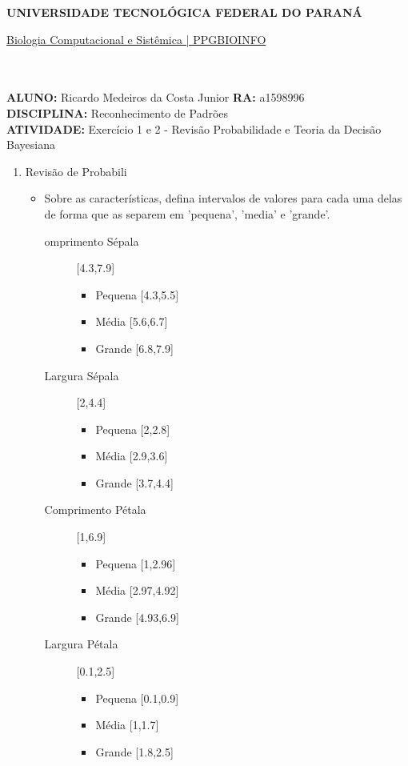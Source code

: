 \documentclass[a4paper, 12pt]{article}
\begin{document}
\textbf{UNIVERSIDADE TECNOLÓGICA FEDERAL DO PARANÁ}\\
\centerline{\underline{Biologia Computacional e Sistêmica | PPGBIOINFO}}\\\\
\textbf{ALUNO:} Ricardo Medeiros da Costa Junior   \textbf{RA:} a1598996 \\
\textbf{DISCIPLINA:} Reconhecimento de Padrões\\
\textbf{ATIVIDADE:} Exercício 1 e 2 - Revisão Probabilidade e Teoria da Decisão Bayesiana \\
\begin{enumerate}
  \item Revisão de Probabili
\begin{itemize} 
\item Sobre as características, defina intervalos de valores para cada uma delas de forma que as separem em 'pequena', 'media' e 'grande'.
  \begin{description}
  \item[omprimento Sépala ] [4.3,7.9]
    \begin{itemize}
    \item Pequena {[}4.3,5.5{]}
    \item Média {[}5.6,6.7{]}
    \item Grande {[}6.8,7.9{]}      
    \end{itemize}
  \end{description}
  \begin{description}
  \item[Largura Sépala ] [2,4.4]
    \begin{itemize}
    \item Pequena {[}2,2.8{]}
    \item Média {[}2.9,3.6{]}
    \item Grande {[}3.7,4.4{]}      
    \end{itemize}
  \end{description}
  \begin{description}
  \item[Comprimento Pétala ] [1,6.9]
    \begin{itemize}
    \item Pequena {[}1,2.96{]}
    \item Média {[}2.97,4.92{]}
    \item Grande {[}4.93,6.9{]}      
    \end{itemize}
  \end{description}
  \begin{description}
  \item[Largura Pétala ] [0.1,2.5]
    \begin{itemize}
    \item Pequena {[}0.1,0.9{]}
    \item Média {[}1,1.7{]}
    \item Grande {[}1.8,2.5{]}      
    \end{itemize}
  \end{description}


\end{itemize}
\end{enumerate}
\end{document}
